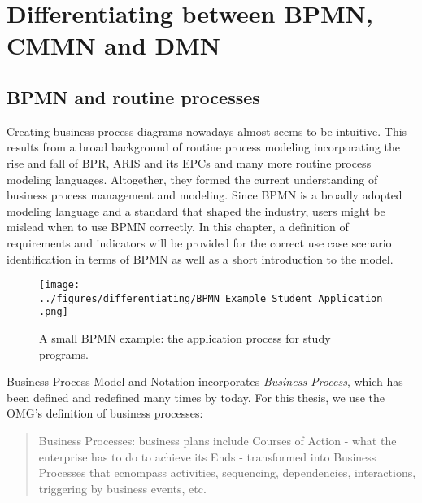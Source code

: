 
\chapter{Differentiating between BPMN, CMMN and DMN}
\label{chapter:indicators}

\section{BPMN and routine processes}
Creating business process diagrams nowadays almost seems to be intuitive. This results from a broad background of routine process modeling incorporating the rise and fall of BPR, ARIS and its EPCs and many more routine process modeling languages. Altogether, they formed the current understanding of business process management and modeling. 
Since BPMN is a broadly adopted modeling language and a standard that shaped the industry, users might be mislead when to use BPMN correctly. In this chapter, a definition of requirements and indicators will be provided for the correct use case scenario identification in terms of BPMN as well as a short introduction to the model. 

\begin{sidewaysfigure}
	\caption{A small BPMN example: the application process for study programs.}
	\label{fig:BPMNex}
	\centering
	\texttt{[image: ../figures/differentiating/BPMN\_Example\_Student\_Application.png]} 
\end{sidewaysfigure}

Business Process Model and Notation incorporates \textit{Business Process}, which has been defined and redefined many times by today. For this thesis, we use the OMG's definition of business processes: 
\begin{quote}
Business Processes: business plans include Courses of Action - what the enterprise has to do to achieve its Ends - transformed into Business Processes that ecnompass activities, sequencing, dependencies, interactions, triggering by business events, etc. \cite{bmm2015}
\end{quote}

